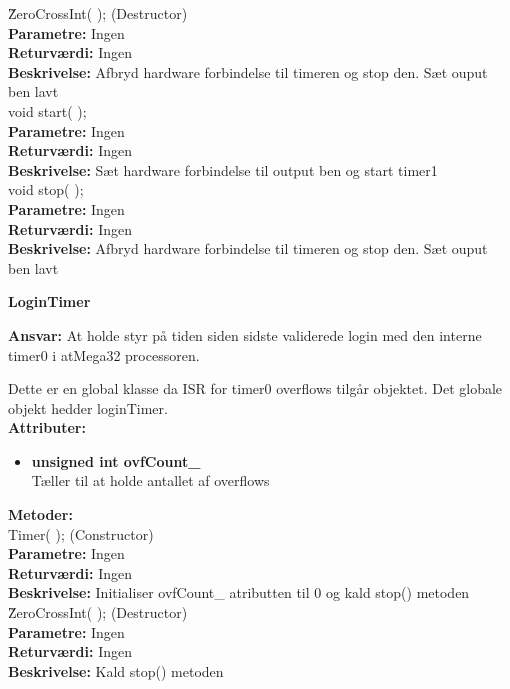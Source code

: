 \~ZeroCrossInt( ); (Destructor) \\
\textbf{Parametre:} Ingen \\
\textbf{Returværdi:} Ingen \\
\textbf{Beskrivelse:} Afbryd hardware forbindelse til timeren og stop den. Sæt ouput ben lavt \\

void start( ); \\
\textbf{Parametre:} Ingen \\
\textbf{Returværdi:} Ingen \\
\textbf{Beskrivelse:} Sæt hardware forbindelse til output ben og start timer1 \\

void stop( ); \\
\textbf{Parametre:} Ingen \\
\textbf{Returværdi:} Ingen \\
\textbf{Beskrivelse:} Afbryd hardware forbindelse til timeren og stop den. Sæt ouput ben lavt \\

%
%
{\centering
\textbf{LoginTimer}\par
}
\textbf{Ansvar:} At holde styr på tiden siden sidste validerede login med den interne timer0 i atMega32 processoren.

Dette er en global klasse da ISR for timer0 overflows tilgår objektet. Det globale objekt hedder loginTimer. \\
\textbf{Attributer:}
\begin{itemize}
	\item \textbf{unsigned int ovfCount\_} \\
	Tæller til at holde antallet af overflows
\end{itemize}
\textbf{Metoder:} \\
Timer( ); (Constructor) \\
\textbf{Parametre:} Ingen \\
\textbf{Returværdi:} Ingen \\
\textbf{Beskrivelse:} Initialiser ovfCount\_ atributten til 0 og kald stop() metoden \\

\~ZeroCrossInt( ); (Destructor) \\
\textbf{Parametre:} Ingen \\
\textbf{Returværdi:} Ingen \\
\textbf{Beskrivelse:} Kald stop() metoden \\

